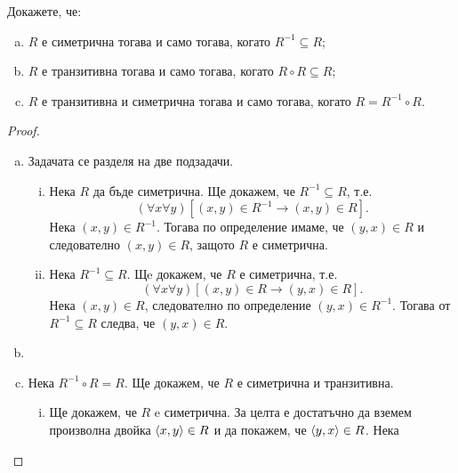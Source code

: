   
\begin{problem}
  Докажете, че:
  \begin{enumerate}[a)]
  \item
    $R$ е симетрична тогава и само тогава, когато $R^{-1}\subseteq R$;
  \item
    $R$ е транзитивна тогава и само тогава, когато $R\circ R\subseteq R$;
  \item
    $R$ е транзитивна и симетрична тогава и само тогава, когато $R = R^{-1}\circ R$.
\end{enumerate}
\end{problem}
\begin{proof}
  \begin{enumerate}[a)]
  \item
    Задачата се разделя на две подзадачи.
    \begin{enumerate}[(i)]
    \item
      Нека $R$ да бъде симетрична. Ще докажем, че $R^{-1}\subseteq R$, т.е.
      \[(\forall x\forall y)[(x,y)\in R^{-1} \rightarrow (x,y)\in R].\]
      Нека $(x,y)\in R^{-1}$. Тогава по определение имаме, че $(y,x)\in R$ и следователно $(x,y)\in R$,
      защото $R$ е симетрична.
    \item
      Нека $R^{-1}\subseteq R$. Щe докажем, че $R$ е симетрична, т.е.
      \[(\forall x\forall y)[(x,y)\in R \rightarrow (y,x)\in R].\]
      Нека $(x,y)\in R$, следователно по определение $(y,x)\in R^{-1}$.
      Тогава от $R^{-1}\subseteq R$ следва, че $(y,x)\in R$.
    \end{enumerate}
  \item
  \item
    Нека $R^{-1}\circ R = R$. Ще докажем, че $R$
    е симетрична и транзитивна.
    \begin{enumerate}[(i)]
    \item
      Ще докажем, че $R$ e симетрична.
      За целта е достатъчно да вземем произволна двойка $\langle{x,y}\rangle \in R$
      и да покажем, че $\langle{y,x}\rangle \in R$.
      Нека 

\end{enumerate}
\end{enumerate}
\end{proof}
